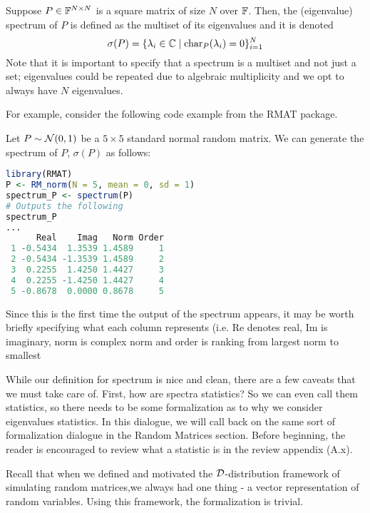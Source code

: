 
\begin{definition}[Spectrum]
Suppose $P \in \mathbb{F}^{N \times N}$ is a square matrix of size $N$ over $\mathbb{F}$. Then, the (eigenvalue) spectrum of $P$ is defined as the multiset of its eigenvalues and it is denoted
$$\sigma(P) = \{\lambda_i \in \mathbb{C} \mid \text{char}_P(\lambda_i) = 0 \}_{i=1}^N$$
Note that it is important to specify that a spectrum is a multiset and not just a set; eigenvalues could be repeated due to algebraic multiplicity and we opt to always have $N$ eigenvalues.
\end{definition}

\medskip
\noindent For example, consider the following code example from the RMAT package.
\begin{code}
Let $P \sim \mathcal{N}(0,1)$ be a $5 \times 5$ standard normal random matrix. We can generate the spectrum of $P$, $\sigma(P)$ as follows:
\end{code}

\begin{lstlisting}[language=R]
library(RMAT)
P <- RM_norm(N = 5, mean = 0, sd = 1)
spectrum_P <- spectrum(P)
# Outputs the following
spectrum_P
...
      Real    Imag   Norm Order
 1 -0.5434  1.3539 1.4589     1
 2 -0.5434 -1.3539 1.4589     2
 3  0.2255  1.4250 1.4427     3
 4  0.2255 -1.4250 1.4427     4
 5 -0.8678  0.0000 0.8678     5
\end{lstlisting}


Since this is the first time the output of the spectrum appears, it may be worth briefly specifying what each column represents (i.e. Re denotes real,
Im is imaginary, norm is complex norm and order is ranking from largest norm to smallest

While our definition for spectrum is nice and clean, there are a few caveats that we must take care of.
First, how are spectra statistics? So we can even call them statistics, so there needs to be some formalization as to why we consider eigenvalues statistics.
In this dialogue, we will call back on the same sort of formalization dialogue in the Random Matrices section.
Before beginning, the reader is encouraged to review what a statistic is in the review appendix (A.x).

Recall that when we defined and motivated the $\mathcal{D}$-distribution framework of simulating random matrices,we always had one thing - a vector representation of random variables.
Using this framework, the formalization is trivial.

